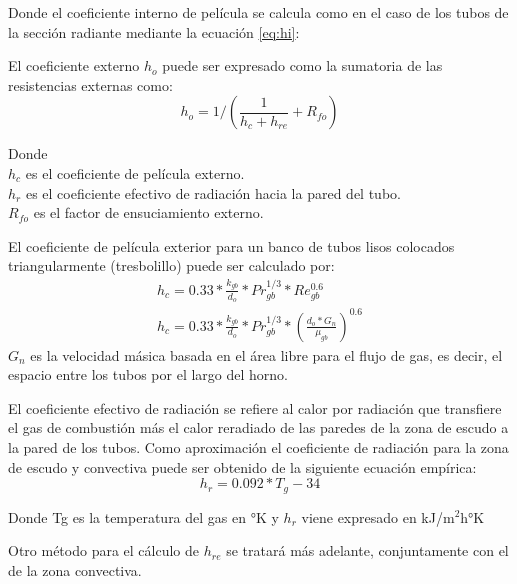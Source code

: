 \par Donde el coeficiente interno de película se calcula como en el caso de los tubos de la sección radiante mediante la ecuación \ref{eq:hi}:

\par El coeficiente externo $h_o$ puede ser expresado como la sumatoria de las resistencias externas como:
\begin{equation}
\label{eq:ho}
h_o = 1/(\frac{1}{h_c + h_{re}} + R_{fo})
\end{equation}
\par Donde \\
$h_c$ es el coeficiente de película externo.\\
$h_r$ es el coeficiente efectivo de radiación hacia la pared del tubo.\\
$R_{fo}$ es el factor de ensuciamiento externo.\\

\par El coeficiente de película exterior para un banco de tubos lisos colocados triangularmente (tresbolillo) puede ser calculado por:
\begin{equation}
\label{eq:hc}
\begin{gathered}
h_c = 0.33 * \frac{k_{gb}}{d_o} *Pr_{gb}^{1/3} *Re_{gb}^{0.6}\\
h_c = 0.33 * \frac{k_{gb}}{d_o} *Pr_{gb}^{1/3} *(\frac{d_o*G_n}{\mu_{gb}})^{0.6}
\end{gathered}
\end{equation}
$G_n$ es la velocidad másica basada en el área libre para el flujo de gas, es decir, el espacio entre los tubos por el largo del horno.

\par El coeficiente efectivo de radiación se refiere al calor por radiación que transfiere el gas de combustión más el calor reradiado de las paredes de la zona de escudo a la pared de los tubos. Como aproximación el coeficiente de radiación para la zona de escudo y convectiva puede ser obtenido de la siguiente ecuación empírica:
\begin{equation}
\label{eq:hr}
h_r = 0.092*T_g - 34  
\end{equation}
\par Donde Tg es la temperatura del gas en °K y $h_r$ viene expresado en kJ/m$^2$h°K

\par Otro método para el cálculo de $h_{re}$ se tratará más adelante, conjuntamente con el de la zona convectiva.

